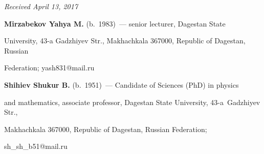 \vspace*{-3pt}





\hfill{\small\textit{Received April 13, 2017}}













      \Contr


      


      \noindent


     \textbf{Mirzabekov Yahya M.} (b.\ 1983)~--- senior lecturer, Dagestan State 


University, 43-a Gadzhiyev Str., Makhachkala 367000, Republic of Dagestan, Russian 


Federation; \mbox{yash831@mail.ru}


      


      \vspace*{3pt}


      


      \noindent


      \textbf{Shihiev Shukur B.} (b.\ 1951)~--- Candidate of Sciences (PhD) in physics 


and mathematics, associate professor, Dagestan State University, 43-a~Gadzhiyev Str., 


Makhachkala 367000, Republic of Dagestan, Russian Federation; 


\mbox{sh\_sh\_b51@mail.ru}


\label{end\stat}








\renewcommand{\bibname}{\protect\rm Литература} 


